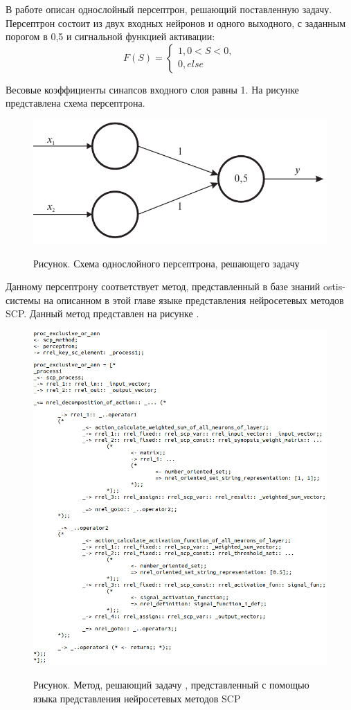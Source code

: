 В работе  описан однослойный персептрон, решающий поставленную задачу. Персептрон состоит из двух входных нейронов и одного выходного, с заданным порогом в 0,5 и сигнальной функцией активации:
\begin{equation*}
	F(S) =
	\begin{cases}
		1, 0 < S < 0,\\
		0, else
	\end{cases}
\end{equation*}

Весовые коэффициенты синапсов входного слоя равны 1. На рисунке \textit{} представлена схема персептрона.

\begin{figure}
	\caption{Рисунок. Схема однослойного персептрона, решающего задачу }
	\includegraphics[width=0.5\linewidth]{author/part3/figures/strong_or_ann.png}
	\label{fig:strong_or_ann}
\end{figure}

Данному персептрону соответствует метод, представленный в базе знаний ostis-системы на описанном в этой главе языке представления нейросетевых методов SCP. Данный метод представлен на рисунке \textit{}.

\begin{figure}
	\caption{Рисунок. Метод, решающий задачу , представленный с помощью языка представления нейросетевых методов SCP}
	\includegraphics[width=0.95\linewidth]{author/part3/figures/exclusive_or_ann_scp.png}
	\label{fig:exclusive_or_ann_scp}
\end{figure}

